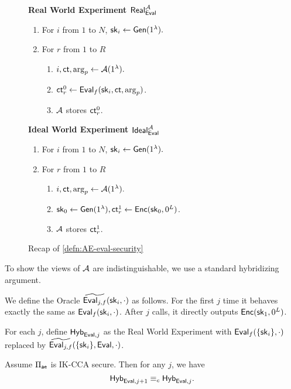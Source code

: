 \begin{figure}[h!]
\begin{framed}
\textbf{Real World Experiment $\mathsf{Real}^{\mathcal{A}}_{\mathsf{Eval}}$}
\begin{enumerate}
    \item For $i$ from $1$ to $N$, ${\mathsf{sk}}_i \leftarrow \mathsf{Gen}(1^{\lambda}).$
    \item For $r$ from $1$ to $R$
    \begin{enumerate}
        \item $i, \mathsf{ct}, \arg_p \leftarrow \mathcal{A}(1^{\lambda}).$
        \item $\mathsf{ct}^{0}_r \leftarrow \mathsf{Eval}_f({\mathsf{sk}}_i, \mathsf{ct}, \arg_p)$.
        \item $\mathcal{A}$ stores $\mathsf{ct}^{0}_r$.
    \end{enumerate}
\end{enumerate}
\textbf{Ideal World Experiment $\mathsf{Ideal}^{\mathcal{A}}_{\mathsf{Eval}}$}
\begin{enumerate}
    \item For $i$ from $1$ to $N$, ${\mathsf{sk}}_i \leftarrow \mathsf{Gen}(1^{\lambda}).$
    \item For $r$ from $1$ to $R$
    \begin{enumerate}
        \item $i, \mathsf{ct}, \arg_p \leftarrow \mathcal{A}(1^{\lambda}).$
        \item ${\mathsf{sk}}_0 \leftarrow \mathsf{Gen}(1^{\lambda}), \mathsf{ct}^{1}_r \leftarrow \mathsf{Enc}({\mathsf{sk}}_0, 0^L)$.
        \item $\mathcal{A}$ stores $\mathsf{ct}^{1}_r$.
    \end{enumerate}
\end{enumerate}
\end{framed}
\caption{Recap of \cref{defn:AE-eval-security}}
\end{figure}
To show the views of $\mathcal{A}$ are indistinguishable, we use a standard hybridizing argument. 
\begin{definition}
We define the Oracle $\widetilde{\mathsf{Eval}_{j, f}}({\mathsf{sk}}_i, \cdot)$ as follows. For the first $j$ time it behaves exactly the same as $\mathsf{Eval}_f({\mathsf{sk}}_i, \cdot)$. After $j$ calls, it directly outputs $\mathsf{Enc}({\mathsf{sk}}_1, 0^L)$.

For each $j$, define $\mathsf{Hyb}_{\mathsf{Eval}, j}$ as the Real World Experiment with $\mathsf{Eval}_f(\{{\mathsf{sk}}_i\}, \cdot)$ replaced by $\widetilde{\mathsf{Eval}_{j, f}}(\{{\mathsf{sk}}_i\}, \mathsf{Eval}, \cdot)$. 
\end{definition}
\begin{lemma}
     Assume $\Pi_{\mathsf{ae}}$ is IK-CCA secure. Then for any $j$, we have 
    $$\mathsf{Hyb}_{\mathsf{Eval}, j + 1} \equiv_c \mathsf{Hyb}_{\mathsf{Eval}, j}.$$
\end{lemma}
